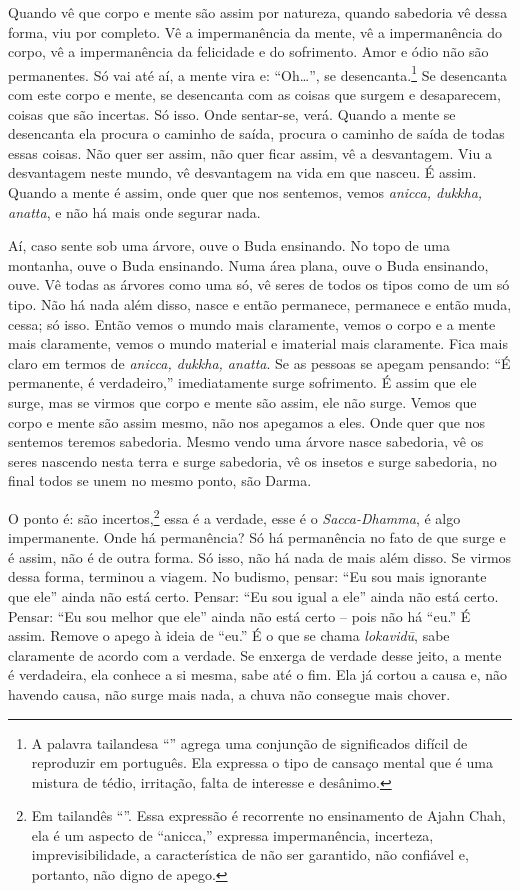 Quando vê que corpo e mente são assim por natureza, quando sabedoria
vê dessa forma, viu por completo. Vê a impermanência da mente, vê a
impermanência do corpo, vê a impermanência da felicidade e do
sofrimento. Amor e ódio não são permanentes. Só vai até aí, a mente
vira e: “Oh…”, se desencanta.\footnote{A palavra tailandesa
“” agrega uma conjunção de significados
difícil de reproduzir em português. Ela expressa o tipo de cansaço
mental que é uma mistura de tédio, irritação, falta de interesse e
desânimo.} Se desencanta com este corpo e mente, se desencanta com as
coisas que surgem e desaparecem, coisas que são incertas. Só isso. Onde
sentar-se, verá. Quando a mente se desencanta ela procura o caminho de
saída, procura o caminho de saída de todas essas coisas. Não quer ser
assim, não quer ficar assim, vê a desvantagem. Viu a desvantagem neste
mundo, vê desvantagem na vida em que nasceu. É assim. Quando a mente é
assim, onde quer que nos sentemos, vemos \textit{anicca, dukkha,
anatta}, e não há mais onde segurar nada. 

Aí, caso sente sob uma árvore, ouve o Buda ensinando. No topo de uma
montanha, ouve o Buda ensinando. Numa área plana, ouve o Buda
ensinando, ouve. Vê todas as árvores como uma só, vê seres de todos os
tipos como de um só tipo. Não há nada além disso, nasce e então
permanece, permanece e então muda, cessa; só isso. Então vemos o mundo
mais claramente, vemos o corpo e a mente mais claramente, vemos o mundo
material e imaterial mais claramente. Fica mais claro em
termos de \textit{anicca, dukkha, anatta}. Se as pessoas se apegam
pensando: “É permanente, é verdadeiro,” imediatamente surge sofrimento.
É assim que ele surge, mas se virmos que corpo e mente são assim, ele
não surge. Vemos que corpo e mente são assim mesmo, não nos apegamos a
eles. Onde quer que nos sentemos teremos sabedoria. Mesmo vendo uma
árvore nasce sabedoria, vê os seres nascendo nesta terra e surge
sabedoria, vê os insetos e surge sabedoria, no final todos se unem no
mesmo ponto, são Darma. 

O ponto é: são incertos,\footnote{Em tailandês
“”. Essa expressão é recorrente no
ensinamento de Ajahn Chah, ela é um aspecto de “anicca,” expressa
impermanência, incerteza, imprevisibilidade, a característica de não
ser garantido, não confiável e, portanto, não digno de apego.} essa é
a verdade, esse é o \textit{Sacca-Dhamma}, é algo impermanente. Onde há
permanência? Só há permanência no fato de que surge e é assim, não é de
outra forma. Só isso, não há nada de mais além disso. Se virmos dessa
forma, terminou a viagem. No budismo, pensar: “Eu sou mais ignorante
que ele” ainda não está certo. Pensar: “Eu sou igual a ele” ainda não
está certo. Pensar: “Eu sou melhor que ele” ainda não está certo – pois
não há “eu.” É assim. Remove o apego à ideia de “eu.” É o que se chama
\textit{lokavidū}, sabe claramente de acordo com a verdade. Se
enxerga de verdade desse jeito, a mente é verdadeira, ela conhece a si
mesma, sabe até o fim. Ela já cortou a causa e, não havendo causa, não
surge mais nada, a chuva não consegue mais chover.

